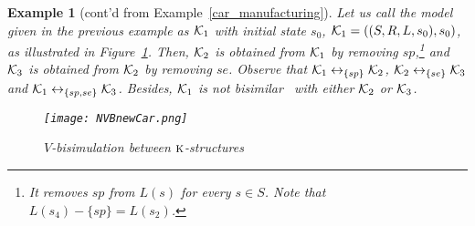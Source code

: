 \documentclass{article}
\newtheorem{example}{Example}
\begin{document}
\begin{example}[cont'd from Example~\ref{car_manufacturing}]\label{ex:2}
Let us call the model given in the previous example as ${\cal K}_1$ with initial state $s_0$, \ie ${\cal K}_1=((S,R,L,s_0),s_0)$, as illustrated in Figure~\ref{v1uv2}. Then, ${\cal K}_2$ is obtained from ${\cal K}_1$ by  removing  $sp$,\footnote{It removes $sp$ from $L(s)$ for every $s\in S$. Note that $L(s_4)-\{sp\}=L(s_2)$.} and  ${\cal K}_3$ is obtained from ${\cal K}_2$ by removing $se$.
Observe that ${\cal K}_1\leftrightarrow_{\{sp\}} {\cal K}_2$, ${\cal K}_2\leftrightarrow_{\{se\}} {\cal K}_3$ and ${\cal K}_1\leftrightarrow_{\{sp,se\}} {\cal K}_3$. Besides,  ${\cal K}_1$ is not bisimilar~\cite{Baier:PMC:2008} with either ${\cal K}_2$ or ${\cal K}_3$.
\begin{figure}[ht]
  \centering
  \texttt{[image: NVBnewCar.png]}\\
  \caption{$V$-bisimulation between $\textsc{k}$-structures}\label{v1uv2}
\end{figure}

\end{example}

\end{document}
